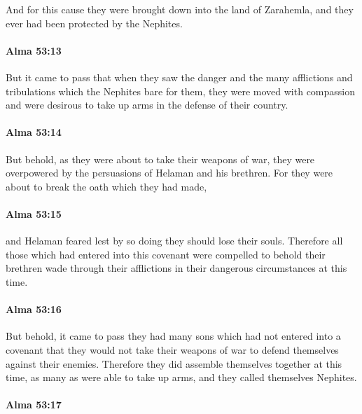 			And for this cause they were brought down into the land of Zarahemla,
			and they ever had been protected by the Nephites.

		\paragraph{Alma 53:13} %
			\label{ALMA-53-13}

			But it came to pass that
			when they saw the danger and the many afflictions and tribulations
			which the Nephites bare for them,
			they were moved with compassion
			and were desirous to take up arms in the defense of their country.

		\paragraph{Alma 53:14} %
			\label{ALMA-53-14}

			But behold, as they were about to take their weapons of war,
			they were overpowered by the persuasions of Helaman and his brethren.
			For they were about to break the oath which they had made,

		\paragraph{Alma 53:15} %
			\label{ALMA-53-15}

			and Helaman feared lest by so doing they should lose their souls.
			Therefore all those which had entered into this covenant
			were compelled to behold their brethren wade through their afflictions
			in their dangerous circumstances at this time.

		\paragraph{Alma 53:16} %
			\label{ALMA-53-16}

			But behold, it came to pass they had many sons
			which had not entered into a covenant
			that they would not take their weapons of war
			to defend themselves against their enemies.
			Therefore they did assemble themselves together at this time,
			as many as were able to take up arms,
			and they called themselves Nephites.

		\paragraph{Alma 53:17} %
			\label{ALMA-53-17}

